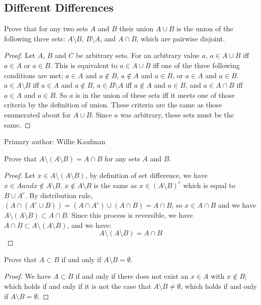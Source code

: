 \subsection{Different Differences}%
			\begin{minorEx}%
            Prove that for any two sets $A$ and $B$ their union $A \cup B$ is the union of the following three sets: $A \setminus B$, $B \setminus A$, and $A \cap B$, which are pairwise disjoint.
            \begin{proof}Let $A$, $B$ and $C$ be arbitrary sets. For an arbitrary value $a$, $a \in A \cup B$ iff $a \in A$ or $a \in B$. This is equivalent to $a \in A \cup B$ iff one of the three following conditions are met; $a \in A$ and $a \not \in B$, $a \not \in A$ and $a \in B$, or $a \in A$ and $a \in B$. \newline $a \in A \setminus B$ iff $a \in A$ and $a \not \in B$, $a \in B \setminus A$ iff $a \not \in A$ and $a \in B$, and $a \in A \cap B$ iff $a \in A$ and $a \in B$. So $a$ is in the union of these sets iff it meets one of those criteria by the definition of union. These criteria are the same as those enumerated about for $A \cup B$. Since $a$ was arbitrary, these sets must be the same.
            
            \end{proof}
            \end{minorEx}
 Primary author: Willie Kaufman
            \begin{minorEx} %
            Prove that $A \setminus (A \setminus B) = A \cap B$ for any sets $A$ and $B$.
            \begin{proof}
            Let $x \in A \setminus (A \setminus B)$, by definition of set difference, we have $x \in A and x \not\in A \setminus B$. $x \not\in A \setminus B$ is the same as $x \in  (A \setminus B)^c$ which is equal to $B \cup A^c$. By distribution rule, $(A \cap (A^c \cup B)) = (A \cap A^c) \cup (A \cap B) = A \cap B$, so $x \in A \cap B$ and we have $A \setminus (A \setminus B) \subset A \cap B$. Since this process is reversible, we have $A \cap B  \subset A \setminus (A \setminus B)$, and we have: $$A \setminus (A \setminus B) = A \cap B$$
            \end{proof}
            \end{minorEx}

            \begin{minorEx} %
            Prove that $A \subset B$ if and only if $A \setminus B = \emptyset$.
            \end{minorEx}
            \begin{proof}
            We have $A \subset B$ if and only if there does not exist an $x \in A$ with $x \notin B$; which holds if and only if it is not the case that $A \setminus B \ne \emptyset$, which holds if and only if $A \setminus B = \emptyset$.
			\end{proof}
            
